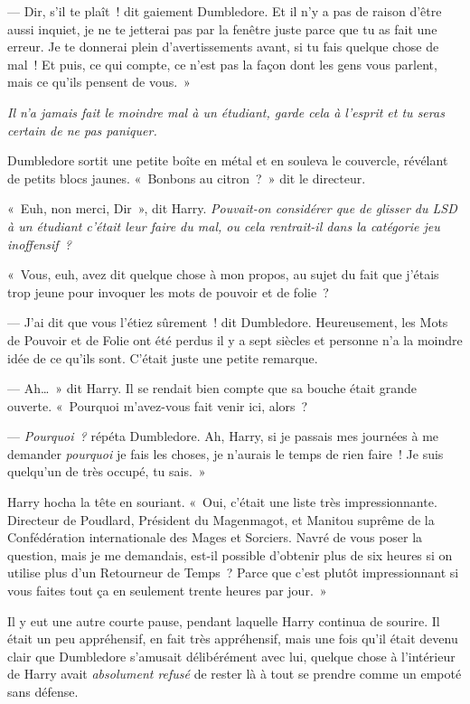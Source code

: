 --- Dir, s'il te plaît~! dit gaiement Dumbledore. Et il n'y a pas de raison d'être aussi inquiet, je ne te jetterai pas par la fenêtre juste parce que tu as fait une erreur. Je te donnerai plein d'avertissements avant, si tu fais quelque chose de mal~! Et puis, ce qui compte, ce n'est pas la façon dont les gens vous parlent, mais ce qu'ils pensent de vous.~»

\emph{Il n'a jamais fait le moindre mal à un étudiant, garde cela à l'esprit et tu seras certain de ne pas paniquer.}

Dumbledore sortit une petite boîte en métal et en souleva le couvercle, révélant de petits blocs jaunes. «~Bonbons au citron~?~» dit le directeur.

«~Euh, non merci, Dir~», dit Harry. \emph{Pouvait-on considérer que de glisser du LSD à un étudiant c'était leur faire du mal, ou cela rentrait-il dans la catégorie jeu inoffensif~?}

«~Vous, euh, avez dit quelque chose à mon propos, au sujet du fait que j'étais trop jeune pour invoquer les mots de pouvoir et de folie~?

--- J'ai dit que vous l'étiez sûrement~! dit Dumbledore. Heureusement, les Mots de Pouvoir et de Folie ont été perdus il y a sept siècles et personne n'a la moindre idée de ce qu'ils sont. C'était juste une petite remarque.

--- Ah…~» dit Harry. Il se rendait bien compte que sa bouche était grande ouverte. «~Pourquoi m'avez-vous fait venir ici, alors~?

--- \emph{Pourquoi~?} répéta Dumbledore. Ah, Harry, si je passais mes journées à me demander \emph{pourquoi} je fais les choses, je n'aurais le temps de rien faire~! Je suis quelqu'un de très occupé, tu sais.~»

Harry hocha la tête en souriant. «~Oui, c'était une liste très impressionnante. Directeur de Poudlard, Président du Magenmagot, et Manitou suprême de la Confédération internationale des Mages et Sorciers. Navré de vous poser la question, mais je me demandais, est-il possible d'obtenir plus de six heures si on utilise plus d'un Retourneur de Temps~? Parce que c'est plutôt impressionnant si vous faites tout ça en seulement trente heures par jour.~»

Il y eut une autre courte pause, pendant laquelle Harry continua de sourire. Il était un peu appréhensif, en fait très appréhensif, mais une fois qu'il était devenu clair que Dumbledore s'amusait délibérément avec lui, quelque chose à l'intérieur de Harry avait \emph{absolument refusé} de rester là à tout se prendre comme un empoté sans défense.

